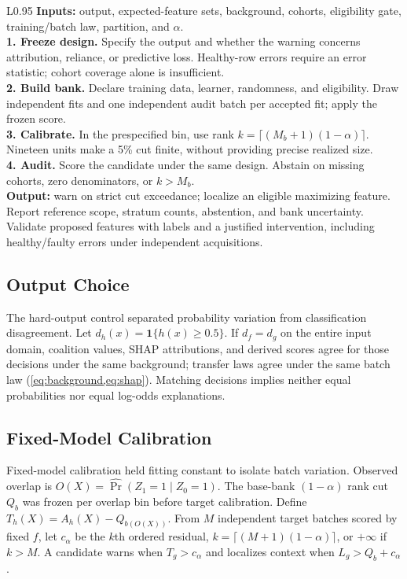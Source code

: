 \documentclass[conference]{IEEEtran}
\begin{document}
\begin{table}[t]
\centering
\caption{Population-reference audit recipe. Fixed-function calibration replaces independent fits by batches scored with one frozen function.}
\label{tab:algorithm}
\footnotesize
\begin{tabular}{L{0.95\columnwidth}}
\toprule
\textbf{Inputs:} output, expected-feature sets, background, cohorts, eligibility gate, training/batch law, partition, and $\alpha$. \\
\textbf{1. Freeze design.} Specify the output and whether the warning concerns attribution, reliance, or predictive loss. Healthy-row errors require an error statistic; cohort coverage alone is insufficient. \\
\textbf{2. Build bank.} Declare training data, learner, randomness, and eligibility. Draw independent fits and one independent audit batch per accepted fit; apply the frozen score. \\
\textbf{3. Calibrate.} In the prespecified bin, use rank $k=\lceil(M_b+1)(1-\alpha)\rceil$. Nineteen units make a 5\% cut finite, without providing precise realized size. \\
\textbf{4. Audit.} Score the candidate under the same design. Abstain on missing cohorts, zero denominators, or $k>M_b$. \\
\textbf{Output:} warn on strict cut exceedance; localize an eligible maximizing feature. Report reference scope, stratum counts, abstention, and bank uncertainty. Validate proposed features with labels and a justified intervention, including healthy/faulty errors under independent acquisitions. \\
\bottomrule
\end{tabular}
\end{table}

\subsection{Output Choice}
The hard-output control separated probability variation from classification disagreement. Let $d_h(x)=\mathbf1\{h(x)\geq0.5\}$. If $d_f=d_g$ on the entire input domain, coalition values, SHAP attributions, and derived scores agree for those decisions under the same background; transfer laws agree under the same batch law (\cref{eq:background,eq:shap}). Matching decisions implies neither equal probabilities nor equal log-odds explanations.

\subsection{Fixed-Model Calibration}
Fixed-model calibration held fitting constant to isolate batch variation. Observed overlap is $O(X)=\widehat{\Pr}(Z_1=1\mid Z_0=1)$. The base-bank $(1-\alpha)$ rank cut $Q_b$ was frozen per overlap bin before target calibration. Define $T_h(X)=A_h(X)-Q_{b(O(X))}$. From $M$ independent target batches scored by fixed $f$, let $c_\alpha$ be the $k$th ordered residual, $k=\lceil(M+1)(1-\alpha)\rceil$, or $+\infty$ if $k>M$. A candidate warns when $T_g>c_\alpha$ and localizes context when $L_g>Q_b+c_\alpha$.
\end{document}
